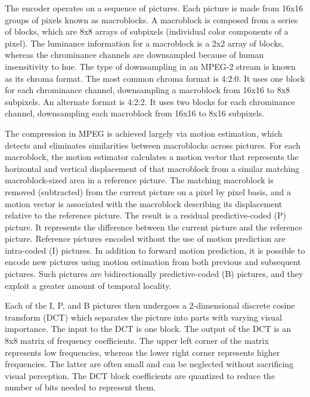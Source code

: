 The encoder operates on a sequence of pictures. Each picture is made
from 16x16 groups of pixels known as macroblocks.  A macroblock is
composed from a series of blocks, which are 8x8 arrays of subpixels
(individual color components of a pixel). The luminance information
for a macroblock is a 2x2 array of blocks, whereas the
chrominance channels are downsampled because of human insensitivity to
hue. The type of downsampling in an MPEG-2 stream is known as its
chroma format. The most common chroma format is 4:2:0. It uses one
block for each chrominance channel, downsampling a macroblock from
16x16 to 8x8 subpixels. An alternate format is 4:2:2. It uses two
blocks for each chrominance channel, downsampling each macroblock from
16x16 to 8x16 subpixels.

The compression in MPEG is achieved largely via motion estimation,
which detects and eliminates similarities between macroblocks across
pictures. For each macroblock, the motion estimator calculates a motion
vector that represents the horizontal and vertical displacement of that 
macroblock from a similar matching
macroblock-sized area in a reference picture.  The matching macroblock
is removed (subtracted) from the current picture on a pixel by pixel
basis, and a motion vector is associated with the macroblock
describing its displacement relative to the reference picture. The
result is a residual predictive-coded (P) picture. It represents the
difference between the current picture and the reference
picture. Reference pictures encoded without the use of motion
prediction are intra-coded (I) pictures. In addition to forward motion
prediction, it is possible to encode new pictures using motion
estimation from both previous and subsequent pictures. Such pictures
are bidirectionally predictive-coded (B) pictures, and they exploit a
greater amount of temporal locality.

Each of the I, P, and B pictures then undergoes a 2-dimensional
discrete cosine transform (DCT) which separates the picture into parts
with varying visual importance. The input to the DCT is one block.
The output of the
DCT is an 8x8 matrix of frequency coefficients. The upper left corner
of the matrix represents low frequencies, whereas the lower right
corner represents higher frequencies. The latter are often small and
can be neglected without sacrificing visual perception. The DCT 
block coefficients are quantized to reduce the number of bits needed
to represent them. 

